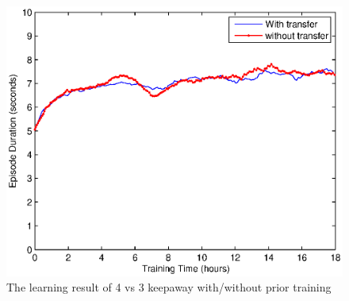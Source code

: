 \begin{figure}[h]
    \centering
    \begin{minipage}[t]{0.6\linewidth}
        \centering
        \includegraphics[width=\textwidth] {./figures/4vs3transfer.eps}
        \caption{The learning result of 4 vs 3 keepaway with/without prior training}
    \label{fig:4vs3transfer}
    \end{minipage}
\end{figure}

